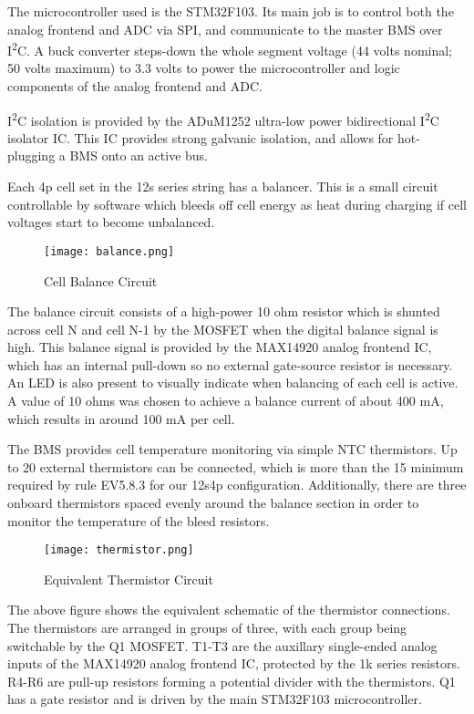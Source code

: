 \documentclass[12pt]{article}
\newcommand{\iic}{I\textsuperscript{2}C}
\begin{document}
The microcontroller used is the STM32F103.
Its main job is to control both the analog frontend and ADC via SPI, and communicate to the master BMS over \iic{}.
A buck converter steps-down the whole segment voltage (44 volts nominal; 50 volts maximum) to 3.3 volts to power the microcontroller and logic components of the analog frontend and ADC.

\iic{} isolation is provided by the ADuM1252 ultra-low power bidirectional \iic{} isolator IC.
This IC provides strong galvanic isolation, and allows for hot-plugging a BMS onto an active bus.

Each 4p cell set in the 12s series string has a balancer.
This is a small circuit controllable by software which bleeds off cell energy as heat during charging if cell voltages start to become unbalanced.

\begin{figure}[H]
  \centering
  \texttt{[image: balance.png]}
  \caption{Cell Balance Circuit}
  \label{fig:bms-balance-circuit}
\end{figure}

The balance circuit consists of a high-power 10 ohm resistor which is shunted across cell N and cell N-1 by the MOSFET when the digital balance signal is high.
This balance signal is provided by the MAX14920 analog frontend IC, which has an internal pull-down so no external gate-source resistor is necessary.
An LED is also present to visually indicate when balancing of each cell is active.
A value of 10 ohms was chosen to achieve a balance current of about 400 mA, which results in around 100 mA per cell.

The BMS provides cell temperature monitoring via simple NTC thermistors.
Up to 20 external thermistors can be connected, which is more than the 15 minimum required by rule EV5.8.3 for our 12s4p configuration.
Additionally, there are three onboard thermistors spaced evenly around the balance section in order to monitor the temperature of the bleed resistors.

\begin{figure}[H]
  \centering
  \texttt{[image: thermistor.png]}
  \caption{Equivalent Thermistor Circuit}
  \label{fig:bms-thermistor-circuit}
\end{figure}

The above figure shows the equivalent schematic of the thermistor connections.
The thermistors are arranged in groups of three, with each group being switchable by the Q1 MOSFET.
T1-T3 are the auxillary single-ended analog inputs of the MAX14920 analog frontend IC, protected by the 1k series resistors.
R4-R6 are pull-up resistors forming a potential divider with the thermistors.
Q1 has a gate resistor and is driven by the main STM32F103 microcontroller.
\end{document}
